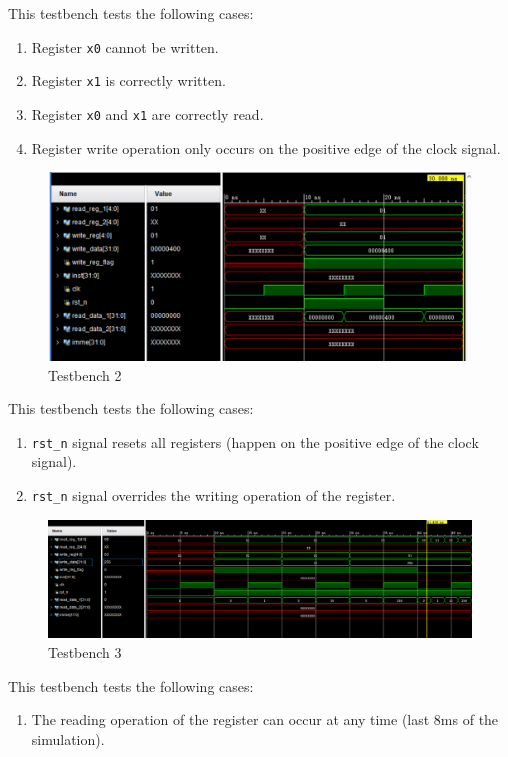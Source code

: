 \documentclass[a4paper,12pt]{article}
\begin{document}
This testbench tests the following cases:
\begin{enumerate}
	\item Register \texttt{x0} cannot be written.
	\item Register \texttt{x1} is correctly written.
	\item Register \texttt{x0} and \texttt{x1} are correctly read.
	\item Register write operation only occurs on the positive edge of the clock signal.
\end{enumerate}

\begin{figure}[H]
	\centering
	\includegraphics[width=\textwidth]{decoder2.png}
	\caption{Testbench 2}
\end{figure}

This testbench tests the following cases:
\begin{enumerate}
	\item \texttt{rst\_n} signal resets all registers (happen on the positive edge of the clock signal).
	\item \texttt{rst\_n} signal overrides the writing operation of the register.
\end{enumerate}

\begin{figure}[H]
	\centering
	\includegraphics[width=\textwidth]{decoder3.png}
	\caption{Testbench 3}
\end{figure}

This testbench tests the following cases:
\begin{enumerate}
	\item The reading operation of the register can occur at any time (last 8ms of the simulation).
\end{enumerate}
\end{document}
